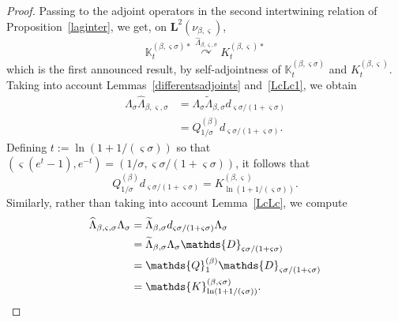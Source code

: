 \documentclass[10pt]{amsart}
\theoremstyle{definition}\newtheorem{defi}[theo]{Definition}\newtheorem{rema}[theo]{Remark}\newtheorem{exam}[theo]{Example}\newtheorem{exem}[theo]{Example}\newtheorem{nota}[theo]{Notation}
\newcommand{\df}{\mathrel{:=}}
\newcommand{\wi}{\widetilde}
\newcommand{\wit}{\widehat}
\newcommand{\dBs}{{\discret{Q}}}
\newcommand{\dLs}{{\discret{K}}}
\newcommand{\Ls}{K}
\newcommand{\esL}{\mathbf{L}}
\newcommand{\discret}[1]{\mathds{#1}}
\newcommand{\Gate}[3]{#1\stackrel{#2}{\curvearrowright}#3}
\begin{document}
\begin{proof}
Passing to the adjoint operators in the second intertwining relation of Proposition~\ref{laginter}, we get, on $\esL^2(\nu_{\beta,\varsigma})$,
\[
\Gate{\dLs_{t}^{(\beta,\varsigma\sigma)*}}{\wit \Lambda_{\beta,\varsigma,\sigma}}{\Ls_{t}^{(\beta,\varsigma)*}}
\]
which is the first announced result, by self-adjointness of $\dLs_{t}^{(\beta,\varsigma\sigma)}$ and $\Ls_{t}^{(\beta,\varsigma)}$. Taking into account Lemmas~\ref{differentsadjoints} and~\ref{LcLc1}, we obtain
\begin{align*}
\Lambda_\sigma\wit \Lambda_{\beta,\varsigma,\sigma}&=\Lambda_\sigma\wi \Lambda_{\beta,\sigma}d_{\varsigma\sigma/(1+\varsigma\sigma)}\\
&=Q_{1/\sigma}^{(\beta)}d_{\varsigma\sigma/(1+\varsigma\sigma)}.
\end{align*}
Defining $t\df\ln(1+1/(\varsigma\sigma))$ so that $ (\varsigma(e^t-1),e^{-t})=(1/\sigma,\varsigma\sigma/(1+\varsigma\sigma))$, it follows that
\[
Q_{1/\sigma}^{(\beta)}d_{\varsigma\sigma/(1+\varsigma\sigma)}=K^{(\beta,\varsigma)}_{\ln(1+1/(\varsigma\sigma))}.
\]
Similarly, rather than taking into account Lemma~\ref{LcLc}, we compute
\begin{align*}
\wit \Lambda_{\beta,\varsigma,\sigma}\Lambda_\sigma&=\wi \Lambda_{\beta,\sigma}d_{\varsigma\sigma/(1+\varsigma\sigma)}\Lambda_\sigma\\
&=\wi \Lambda_{\beta,\sigma}\Lambda_\sigma\discret{D}_{\varsigma\sigma/(1+\varsigma\sigma)}\\
&=\dBs^{(\beta)}_1\discret{D}_{\varsigma\sigma/(1+\varsigma\sigma)}\\
&=\dLs^{(\beta,\varsigma\sigma)}_{\ln(1+1/(\varsigma\sigma))}.\qedhere
\end{align*}
\end{proof}
\end{document}
